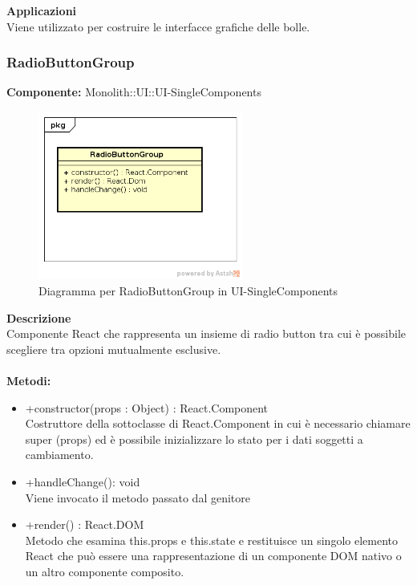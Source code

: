 \textbf{Applicazioni}\\
Viene utilizzato per costruire le interfacce grafiche delle bolle. 


\clearpage

\subsubsection{RadioButtonGroup}
\textbf{Componente:}  Monolith::UI::UI-SingleComponents\\
   \FloatBarrier
   \begin{figure}[ht]
   \centering
   \includegraphics[width=0.6\textwidth]{img/single-RadioButtonGroup}
   \caption{{Diagramma per RadioButtonGroup in UI-SingleComponents}}
\end{figure}
\FloatBarrier
\textbf{Descrizione}\\
Componente React che rappresenta un insieme di radio button tra cui è possibile scegliere tra opzioni mutualmente esclusive.\\\\
\textbf{Metodi:} \begin{itemize}\item +constructor(props : Object) : React.Component \\Costruttore della sottoclasse di React.Component in cui è necessario chiamare super (props) ed è possibile inizializzare lo stato per i dati soggetti a cambiamento.\item +handleChange(): void \\Viene invocato il metodo passato dal genitore\item +render() : React.DOM \\Metodo che esamina this.props e this.state e restituisce un singolo elemento React che può essere una rappresentazione di un componente DOM nativo o un altro componente composito.\end{itemize} 


